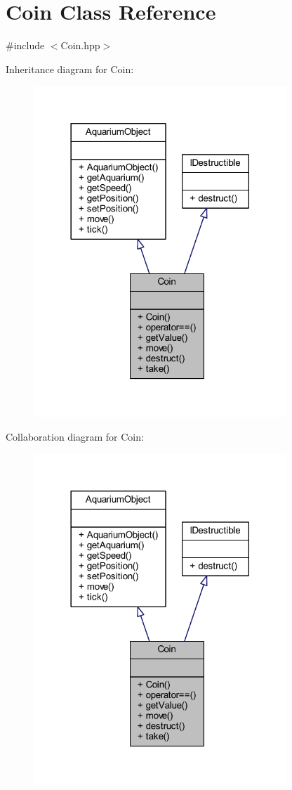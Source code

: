 \hypertarget{class_coin}{}\section{Coin Class Reference}
\label{class_coin}


{\ttfamily \#include $<$Coin.\+hpp$>$}



Inheritance diagram for Coin\+:
\nopagebreak
\begin{figure}[H]
\begin{center}
\leavevmode
\includegraphics[width=270pt]{class_coin__inherit__graph}
\end{center}
\end{figure}


Collaboration diagram for Coin\+:
\nopagebreak
\begin{figure}[H]
\begin{center}
\leavevmode
\includegraphics[width=270pt]{class_coin__coll__graph}
\end{center}
\end{figure}
